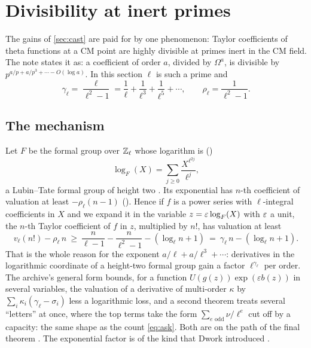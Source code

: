 \section{Divisibility at inert primes}\label{sec:divisibility}

The gains of \cref{sec:cast} are paid for by one phenomenon: Taylor coefficients of theta
functions at a CM point are highly divisible at primes inert in the CM field. The note states
it as: a coefficient of order $a$, divided by $\Omega^a$, is divisible by
$p^{a/p+a/p^3+\cdots-O(\log a)}$. In this section $\ell$ is such a prime and
\[
\gamma_\ell=\frac{\ell}{\ell^2-1}=\frac1\ell+\frac1{\ell^3}+\frac1{\ell^5}+\cdots,\qquad
\rho_\ell=\frac1{\ell^2-1}.
\]

\subsection{The mechanism}
Let $F$ be the formal group over $\mathbb{Z}_\ell$ whose logarithm is \lvS{} ()
\[
\log_F(X)=\sum_{j\ge0}\frac{X^{\ell^{2j}}}{\ell^{j}},
\]
a Lubin--Tate formal group of height two \cite{lubintate1965,honda1970}. Its exponential has
$n$-th coefficient of valuation at least $-\rho_\ell(n-1)$ \lvS{} (). Hence if
$f$ is a power series with $\ell$-integral coefficients in $X$ and we expand it in the variable
$z=\varepsilon\log_F(X)$ with $\varepsilon$ a unit, the $n$-th Taylor coefficient of $f$ in $z$, multiplied
by $n!$, has valuation at least
\[
v_\ell(n!)-\rho_\ell\,n\ \ge\ \frac{n}{\ell-1}-\frac{n}{\ell^2-1}-(\log_\ell n+1)
\ =\ \gamma_\ell\,n-(\log_\ell n+1).
\]
That is the whole reason for the exponent $a/\ell+a/\ell^3+\cdots$: derivatives in the
logarithmic coordinate of a height-two formal group gain a factor $\ell^{\gamma_\ell}$ per
order. The archive's general form \lvS{} bounds, for a function $U(g(z))\exp(\varepsilon b(z))$
in several variables, the valuation of a derivative of multi-order $\kappa$ by
$\sum_i\kappa_i(\gamma_\ell-\sigma_i)$ less a logarithmic loss, and a second theorem treats
several ``letters'' at once, where the top terms take the form $\sum_{e\text{ odd}}\nu/\ell^e$
cut off by a capacity: the same shape as the count \eqref{eq:ask}. Both are on the path of the
final theorem \lvM. The exponential factor is of the kind that Dwork introduced
\cite{dwork1960}.

